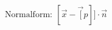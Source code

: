 \documentclass[preview]{standalone}
\begin{document}
\begin{center}
$\mathrm{Normalform: \:} [\vec{x} - \vec[p]] \cdot \vec{n}$
\end{center}
\end{document}
